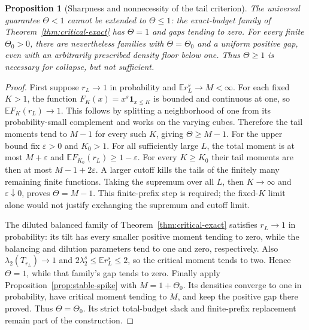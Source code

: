 \documentclass[11pt]{article}
\newtheorem{proposition}[theorem]{Proposition}
\begin{document}
\begin{proposition}[Sharpness and nonnecessity of the tail criterion]
\label{prop:sharp-tail}
The universal guarantee $\Theta<1$ cannot be extended to $\Theta\le1$:
the exact-budget family of Theorem~\ref{thm:critical-exact} has
$\Theta=1$ and gaps tending to zero. For every finite $\Theta_0>0$,
there are nevertheless families with $\Theta=\Theta_0$ and a uniform
positive gap, even with an arbitrarily prescribed density floor below
one. Thus $\Theta\ge1$ is necessary for collapse, but not sufficient.
\end{proposition}
\begin{proof}
First suppose $r_L\to1$ in probability and $\mathbb E r_L^s\to M<\infty$.
For each fixed $K>1$, the function $F_K(x)=x^s\mathbf1_{x\le K}$ is
bounded and continuous at one, so $\mathbb E F_K(r_L)\to1$.
This follows by splitting a neighborhood of one from its probability-small
complement and works on the varying cubes. Therefore the tail moments
tend to $M-1$ for every such $K$, giving $\Theta\ge M-1$.
For the upper bound fix $\varepsilon>0$ and $K_0>1$. For all sufficiently
large $L$, the total moment is at most $M+\varepsilon$ and
$\mathbb E F_{K_0}(r_L)\ge1-\varepsilon$. For every $K\ge K_0$ their
tail moments are then at most $M-1+2\varepsilon$. A larger cutoff kills
the tails of the finitely many remaining finite functions. Taking the
supremum over all $L$, then $K\to\infty$ and $\varepsilon\downarrow0$,
proves $\Theta=M-1$. This finite-prefix step is required; the fixed-$K$
limit alone would not justify exchanging the supremum and cutoff limit.

The diluted balanced family of Theorem~\ref{thm:critical-exact} satisfies
$r_L\to1$ in probability: its tilt has every smaller positive moment
tending to zero, while the balancing and dilution parameters tend to one
and zero, respectively. Also $\lambda_2(T_{r_L})\to1$ and
$2\lambda_2^s\le\mathbb E r_L^s\le2$, so the critical moment tends to
two. Hence $\Theta=1$, while that family's gap tends to zero.
Finally apply Proposition~\ref{prop:stable-spike} with
$M=1+\Theta_0$. Its densities converge to one in probability, have
critical moment tending to $M$, and keep the positive gap there proved.
Thus $\Theta=\Theta_0$. Its strict total-budget slack and finite-prefix
replacement remain part of the construction.
\end{proof}
\end{document}
